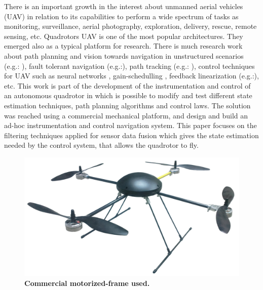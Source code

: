 \documentclass[conference]{IEEEtran}
\begin{document}
There is an important growth in the interest about unmanned aerial vehicles (UAV) in relation to its capabilities to perform a wide spectrum of tasks as monitoring, surveillance, aerial photography, exploration, delivery, rescue, remote sensing, etc.
Quadrotors UAV is one of the most popular architectures.
They emerged also as a typical platform for research. There is much research work about path planning and vision towards navigation in unstructured scenarios (e.g.: \cite{bib:tio_cuatro, bib:tio_seis}), fault tolerant navigation (e.g.:\cite{bib:tio_tres}), path tracking (e.g.: \cite{bib:tio_ocho}), control techniques for UAV such as neural networks \cite{bib:tio_uno}, gain-schedulling \cite{bib:tio_tres}, feedback linearization (e.g.:\cite{bib:tio_seis, bib:tio_siete}), etc.
This work is part of the development of the instrumentation and control of an autonomous quadrotor in which is possible to modify and test different state estimation techniques, path planning algorithms and control laws. The solution was reached using a commercial mechanical platform, and design and build an ad-hoc instrumentation and control navigation system.
This paper focuses on the filtering techniques applied for sensor data fusion which gives the state estimation needed by the control system, that allows the quadrotor to fly.
\begin{figure}[b]
	\centering
	\includegraphics[width=.6\columnwidth]{./pics_paper/javi.png}
	\caption{\textbf{Commercial motorized-frame used.}}
	\label{fig:commercial_quadrotor}
\end{figure}
\end{document}
